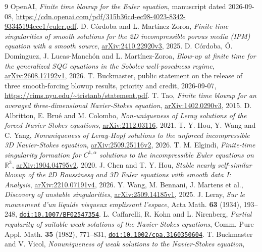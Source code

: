 \documentclass[11pt]{article}
\theoremstyle{remark}
\newcommand{\fp}[1]{\nolinkurl{#1}}
\begin{document}
\begin{thebibliography}{9}
 OpenAI, \emph{Finite time blowup for the Euler equation}, manuscript dated 2026-09-08,
\url{https://cdn.openai.com/pdf/315b36cd-ec98-4023-8342-93345194ece1/euler.pdf}.
 D. C\'ordoba and L. Mart\'inez-Zoroa, \emph{Finite time singularities of smooth solutions for the
2D incompressible porous media (IPM) equation with a smooth source},
\href{https://arxiv.org/abs/2410.22920}{arXiv:2410.22920v3}, 2025.
 D. C\'ordoba, \'O. Dom\'inguez, J. Lucas-Manch\'on and L. Mart\'inez-Zoroa, \emph{Blow-up at finite
time for the generalized SQG equations in the Sobolev well-posedness regime},
\href{https://arxiv.org/abs/2608.17192}{arXiv:2608.17192v1}, 2026.
 T. Buckmaster, public statement on the release of three smooth-forcing blowup results, priority
and credit, 2026-09-07, \url{https://cims.nyu.edu/~tristanb/statement.pdf}.
 T. Tao, \emph{Finite time blowup for an averaged three-dimensional Navier-Stokes equation},
\href{https://arxiv.org/abs/1402.0290}{arXiv:1402.0290v3}, 2015.
 D. Albritton, E. Bru\'e and M. Colombo, \emph{Non-uniqueness of Leray solutions of the forced
Navier-Stokes equations}, \href{https://arxiv.org/abs/2112.03116}{arXiv:2112.03116}, 2021.
 T. Y. Hou, Y. Wang and C. Yang, \emph{Nonuniqueness of Leray-Hopf solutions to the unforced
incompressible 3D Navier-Stokes equation}, \href{https://arxiv.org/abs/2509.25116}{arXiv:2509.25116v2}, 2026.
 T. M. Elgindi, \emph{Finite-time singularity formation for $C^{1,\alpha}$ solutions to the
incompressible Euler equations on $\mathbb R^{3}$}, \href{https://arxiv.org/abs/1904.04795}{arXiv:1904.04795v2}, 2020.
 J. Chen and T. Y. Hou, \emph{Stable nearly self-similar blowup of the 2D Boussinesq and 3D Euler
equations with smooth data I: Analysis}, \href{https://arxiv.org/abs/2210.07191}{arXiv:2210.07191v4}, 2026.
 Y. Wang, M. Bennani, J. Martens et al., \emph{Discovery of unstable singularities},
\href{https://arxiv.org/abs/2509.14185}{arXiv:2509.14185v1}, 2025.
 J. Leray, \emph{Sur le mouvement d'un liquide visqueux emplissant l'espace}, Acta Math.
\textbf{63} (1934), 193--248, \href{https://doi.org/10.1007/BF02547354}{\fp{doi:10.1007/BF02547354}}.
 L. Caffarelli, R. Kohn and L. Nirenberg, \emph{Partial regularity of suitable weak solutions of the
Navier-Stokes equations}, Comm. Pure Appl. Math. \textbf{35} (1982), 771--831,
\href{https://doi.org/10.1002/cpa.3160350604}{\fp{doi:10.1002/cpa.3160350604}}.
 T. Buckmaster and V. Vicol, \emph{Nonuniqueness of weak solutions to the Navier-Stokes equation},

\end{thebibliography}
\end{document}
